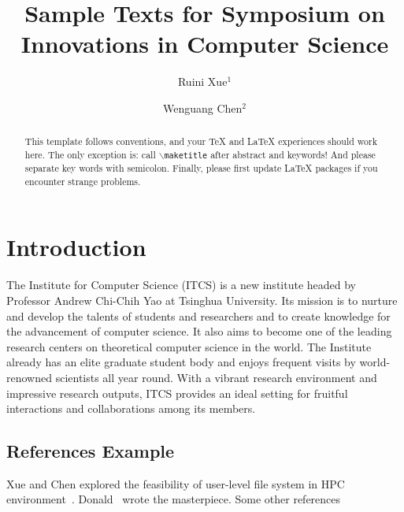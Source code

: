 \documentclass{ics}
\begin{document}
\title{Sample Texts for Symposium on Innovations in Computer Science}
\author{Ruini Xue$^{1}$ \and Wenguang Chen$^{2}$}
\address{1. Tsinghua University Beijing 100084, 2. Insititute of High Performance Computing Beijing 100084}

\begin{abstract} 
  This template follows \LaTeXe{} conventions, and your \TeX{} and \LaTeX{}
  experiences should work here. The only exception is: call
  \texttt{$\backslash$maketitle} after abstract and keywords! And please
  separate key words with semicolon. Finally, please first update \LaTeX{}
  packages if you encounter strange problems.
\end{abstract}


\maketitle


\section{Introduction}
\label{sec:introduction}
The Institute for Computer Science (ITCS) is a new institute headed by Professor
Andrew Chi-Chih Yao at Tsinghua University. Its mission is to nurture and
develop the talents of students and researchers and to create knowledge for the
advancement of computer science. It also aims to become one of the leading
research centers on theoretical computer science in the world. The Institute
already has an elite graduate student body and enjoys frequent visits by
world-renowned scientists all year round. With a vibrant research environment
and impressive research outputs, ITCS provides an ideal setting for fruitful
interactions and collaborations among its members.

\subsection{References Example}
\label{sec:ref-example}
Xue and Chen explored the feasibility of user-level file system in HPC
environment~\cite{xue08}. Donald~ wrote the masterpiece. Some
other references~\cite{xue09,Chafik94}
\end{document}
